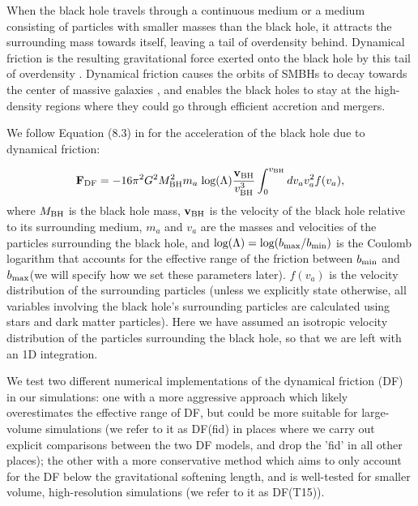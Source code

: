 When the black hole travels through a continuous medium or a medium consisting of particles with smaller masses than the black hole, it attracts the surrounding mass towards itself, leaving a tail of overdensity behind.  Dynamical friction is the resulting gravitational force exerted onto the black hole by this tail of overdensity \citep[e.g.][]{Chandrasekhar1943,Binney2008}. Dynamical friction causes the orbits of SMBHs to decay towards the center of massive galaxies \citep[e.g.][]{Governato1994,Kazantzidis2005}, and enables the black holes to stay at the high-density regions where they could go through efficient accretion and mergers.

We follow Equation (8.3) in \cite{Binney2008} for the acceleration of the black hole due to dynamical friction:

\begin{equation}
\label{eq:df_full}
    \mathbf{F}_{\rm DF} = -16\pi^2 G^2 M_{\rm BH}^2 m_{a} \;\text{log}(\Lambda) \frac{\mathbf{v}_{\rm BH}}{v_{\rm BH}^3} \int_0^{v_{\rm BH}} dv_a v_a^2 f(v_a),
\end{equation}
where $M_{\rm BH}$ is the black hole mass, $\textbf{v}_{\rm BH}$ is the velocity of the black hole relative to its surrounding medium, $m_a$ and $v_a$ are the masses and velocities of the particles surrounding the black hole, and $\text{log}(\Lambda)=\text{log}(b_{\rm max}/b_{\rm min})$ is the Coulomb logarithm that accounts for the effective range of the friction between $b_{\rm min}$ and $b_{\rm max}$(we will specify how we set these parameters later). $f(v_a)$ is the velocity distribution of the surrounding particles (unless we explicitly state otherwise, all variables involving the black hole's surrounding particles are calculated using stars and dark matter particles). Here we have assumed an isotropic velocity distribution of the particles surrounding the black hole, so that we are left with an 1D integration. 

We test two different numerical implementations of the dynamical friction (DF) in our simulations: one with a more aggressive approach which likely overestimates the effective range of DF, but could be more suitable for large-volume simulations (we refer to it as DF(fid) in places where we carry out explicit comparisons between the two DF models, and drop the 'fid' in all other places); the other with a more conservative method which aims to only account for the DF below the gravitational softening length, and is well-tested for smaller volume, high-resolution simulations \citep{Tremmel2015} (we refer to it as DF(T15)).

